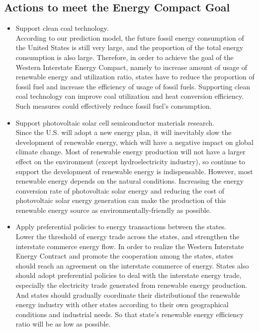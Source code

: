 \documentclass{mcmthesis}
\begin{document}
\subsection{Actions to meet the Energy Compact Goal}
\begin{itemize}
	\item Support clean coal technology.\\ According to our prediction model, the future fossil energy consumption of the United States is still very large, and the proportion of the total energy consumption is also large.  Therefore, in order to achieve the goal of the Western Interstate Energy Compact, namely to increase amount of usage of renewable energy and utilization ratio, states have to reduce the proportion of fossil fuel and increase the efficiency of usage of fossil fuels. Supporting clean coal technology can improve coal utilization and heat conversion efficiency. Such measures could effectively reduce fossil fuel's consumption.
	\item Support photovoltaic solar cell semiconductor materials research.\\ Since the U.S. will adopt a new energy plan, it will inevitably slow the development of renewable energy, which will have a negative impact on global climate change. Most of renewable energy production will not have a larger effect on the environment (except hydroelectricity industry), so continue to support the development of renewable energy is indispensable. However, most renewable energy depends on the natural conditions. Increasing the energy conversion rate of photovoltaic solar energy and reducing the cost of photovoltaic solar energy generation can make the production of this renewable energy source as environmentally-friendly as possible.
	\item Apply preferential policies to energy transactions between the states.\\ Lower the threshold of energy trade across the states, and strengthen the interstate commerce energy flow. In order to realize the Western Interstate Energy Contract and promote the cooperation among the states, states should reach an agreement on the interstate commerce of energy. States also should adopt preferential policies to deal with the interstate energy trade, especially the electricity trade generated from renewable energy production. And states should gradually coordinate their distributionof the renewable energy industry with other states according to their own geographical conditions and industrial needs. So that state's renewable energy efficiency ratio will be as low as possible.
\end{itemize}
%
\end{document}
